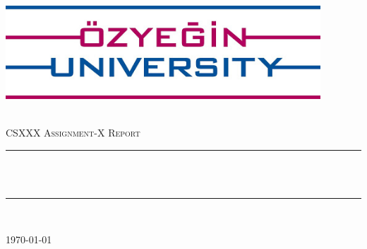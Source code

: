 \begin{titlepage}
\centering
\includegraphics[height=3.5cm]{images/ozu.jpg}\\[1cm]   
\begin{center}

~\\[1.5cm]

\textsc{\Large CSXXX Assignment-X Report}\\[0.5cm]

\hrule ~\\[0.2cm]
{\huge \bfseries \mytitle}\\[0.4cm]		%
\hrule ~\\[1.5cm]

\begin{minipage}{0.4\textwidth}
    \centering
	\large
		\myauthor
\end{minipage}

\vfill

{\large \today}

\end{center}
\end{titlepage}
